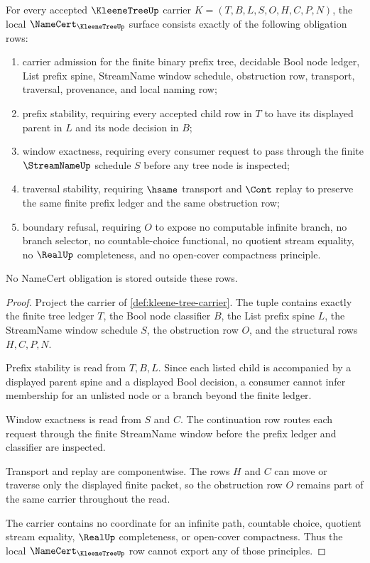\begin{theorem}
\label{thm:kleene-tree-namecert-obligations}
For every accepted $\KleeneTreeUp$ carrier $K=(T,B,L,S,O,H,C,P,N)$, the local $\NameCert_{\KleeneTreeUp}$ surface consists exactly of the following obligation rows:
\begin{enumerate}
\item carrier admission for the finite binary prefix tree, decidable Bool node ledger, List prefix spine, StreamName window schedule, obstruction row, transport, traversal, provenance, and local naming row;
\item prefix stability, requiring every accepted child row in $T$ to have its displayed parent in $L$ and its node decision in $B$;
\item window exactness, requiring every consumer request to pass through the finite $\StreamNameUp$ schedule $S$ before any tree node is inspected;
\item traversal stability, requiring $\hsame$ transport and $\Cont$ replay to preserve the same finite prefix ledger and the same obstruction row;
\item boundary refusal, requiring $O$ to expose no computable infinite branch, no branch selector, no countable-choice functional, no quotient stream equality, no $\RealUp$ completeness, and no open-cover compactness principle.
\end{enumerate}
No NameCert obligation is stored outside these rows.
\end{theorem}
\begin{proof}
Project the carrier of \autoref{def:kleene-tree-carrier}. The tuple contains exactly the finite tree ledger $T$, the Bool node classifier $B$, the List prefix spine $L$, the StreamName window schedule $S$, the obstruction row $O$, and the structural rows $H,C,P,N$.

Prefix stability is read from $T,B,L$. Since each listed child is accompanied by a displayed parent spine and a displayed Bool decision, a consumer cannot infer membership for an unlisted node or a branch beyond the finite ledger.

Window exactness is read from $S$ and $C$. The continuation row routes each request through the finite StreamName window before the prefix ledger and classifier are inspected.

Transport and replay are componentwise. The rows $H$ and $C$ can move or traverse only the displayed finite packet, so the obstruction row $O$ remains part of the same carrier throughout the read.

The carrier contains no coordinate for an infinite path, countable choice, quotient stream equality, $\RealUp$ completeness, or open-cover compactness. Thus the local $\NameCert_{\KleeneTreeUp}$ row cannot export any of those principles.
\end{proof}


